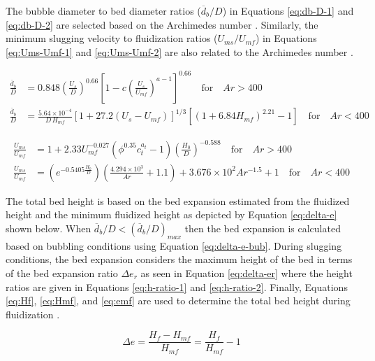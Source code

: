 \documentclass[12pt,titlepage]{article}
\begin{document}
The bubble diameter to bed diameter ratios ($\overline{d}_b/D$) in Equations \ref{eq:db-D-1} and \ref{eq:db-D-2} are selected based on the Archimedes number \cite{Agu-2019a, Werther-1974}. Similarly, the minimum slugging velocity to fluidization ratios ($U_{ms}/U_{mf}$) in Equations \ref{eq:Ums-Umf-1} and \ref{eq:Ums-Umf-2} are also related to the Archimedes number \cite{Agu-2018, Shaul-2012}.

\begin{align}
    \frac{\overline{d}_b}{D} &= 0.848 \left(\frac{U_s}{D} \right)^{0.66} \left[1 - c \left(\frac{U_s}{U_{mf}} \right)^{a - 1} \right]^{0.66} \quad \text{for}\quad Ar > 400 \label{eq:db-D-1} \\
    \frac{\overline{d}_b}{D} &= \frac{5.64\times10^{-4}}{D\,H_{mf}} \left[1 + 27.2 (U_s - U_{mf}) \right]^{1/3} \left[(1 + 6.84 H_{mf})^{2.21} - 1 \right] \quad \text{for}\quad Ar < 400 \label{eq:db-D-2}
\end{align}

\begin{align}
    \frac{U_{ms}}{U_{mf}} &= 1 + 2.33 U_{mf}^{-0.027} \left(\phi^{0.35} c_t^{a_t}-1 \right) \left(\frac{H_0}{D} \right)^{-0.588} \quad \text{for}\quad Ar > 400 \label{eq:Ums-Umf-1} \\
    \frac{U_{ms}}{U_{mf}} &= \left(e^{-0.5405 \frac{H_0}{D}} \right) \left(\frac{4.294\times10^3}{Ar} + 1.1 \right) + 3.676\times10^2 Ar^{-1.5} + 1 \quad \text{for}\quad Ar < 400 \label{eq:Ums-Umf-2}
\end{align}

The total bed height is based on the bed expansion estimated from the fluidized height and the minimum fluidized height as depicted by Equation \ref{eq:delta-e} shown below. When $\overline{d}_b/D < (\overline{d}_b/D)_{max}$ then the bed expansion is calculated based on bubbling conditions using Equation \ref{eq:delta-e-bub}. During slugging conditions, the bed expansion considers the maximum height of the bed in terms of the bed expansion ratio $\Delta e_r$ as seen in Equation \ref{eq:delta-er} where the height ratios are given in Equations \ref{eq:h-ratio-1} and \ref{eq:h-ratio-2}. Finally, Equations \ref{eq:Hf}, \ref{eq:Hmf}, and \ref{eq:emf} are used to determine the total bed height during fluidization \cite{Agu-2019b, Agu-2019f, Agu-2019g, Wen-1966}.

\begin{equation} \label{eq:delta-e}
    \Delta e = \frac{H_f - H_{mf}}{H_{mf}} = \frac{H_f}{H_{mf}} - 1
\end{equation}
\end{document}
